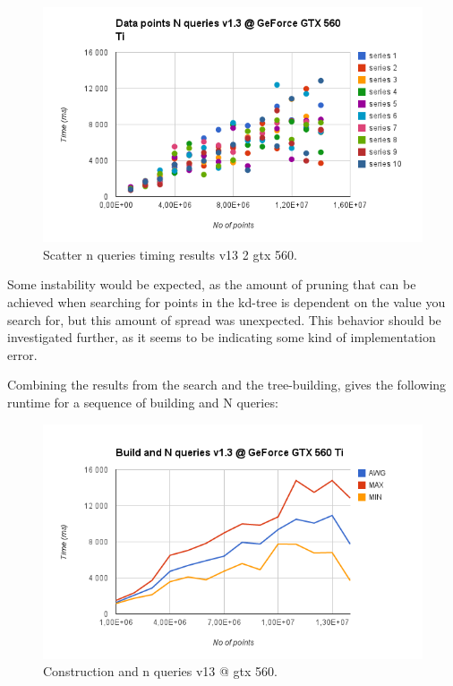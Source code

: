 \begin{figure}[ht!]
\centering
\includegraphics[width=120mm]{../gfx/scatter_n_queries_v13_gtx_560.png}

\caption{Scatter n queries timing results v13 2 gtx 560.}
\label{fig:scatter_n_queries_v13_gtx_560}
\end{figure}

Some instability would be expected, as the amount of pruning that can be achieved when searching for points in the kd-tree is dependent on the value you search for, but this amount of spread was unexpected. This behavior should be investigated further, as it seems to be indicating some kind of implementation error.

Combining the results from the search and the tree-building, gives the following runtime for a sequence of building and N queries:

\begin{figure}[ht!]
\centering
\includegraphics[width=120mm]{../gfx/constructionand_n_queries_v13_gtx_560.png}

\caption{Construction and n queries v13 @ gtx 560.}
\label{fig:constructionand_n_queries_v13_gtx_560}
\end{figure}
